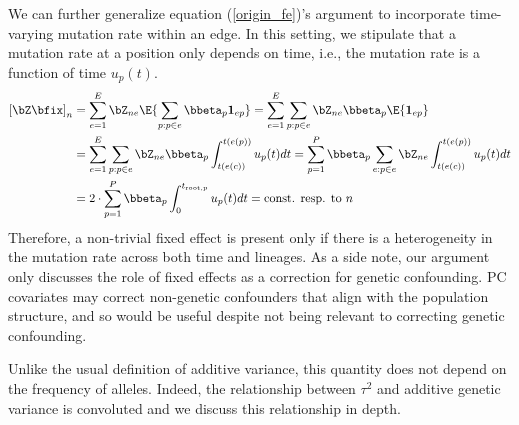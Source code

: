 We can further generalize equation (\ref{origin_fe})'s argument to incorporate time-varying mutation rate within an edge.
In this setting, we stipulate that a mutation rate at a position only depends on time, i.e., the mutation rate is a function of time $u_p(t)$.
\begin{align} 
    \begin{aligned}
        \left[\bZ \bfix \right]_n 
        &= \sum_{e=1}^E \bZ_{ne} \E{ \sum_{p:p\in e} \bbeta_p \mathbf{1}_{ep}}  
        = \sum_{e=1}^E \sum_{p:p\in e} \bZ_{ne} \bbeta_p \E{ \mathbf{1}_{ep}}  \\
        &= \sum_{e=1}^E \sum_{p:p\in e} \bZ_{ne} \bbeta_p \int_{t(e(c))}^{t(e(p))} u_p(t) dt  
        = \sum_{p=1}^P \bbeta_p \sum_{e: p \in e } \bZ_{ne}  \int_{t(e(c))}^{t(e(p))} u_p(t) dt  \\
        &=  2 \cdot \sum_{p=1}^P \bbeta_p \int_{0}^{t_{\mathrm{root},p}} u_p(t) dt
        = \text{const. resp. to $n$}
    \end{aligned}
\end{align}
Therefore, a non-trivial fixed effect is present only if there is a heterogeneity in the mutation rate across both time and lineages.
As a side note, our argument only discusses the role of fixed effects as a correction for genetic confounding.
PC covariates may correct non-genetic confounders that align with the population structure, and so would be useful despite not being relevant to correcting genetic confounding.





Unlike the usual definition of additive variance, this quantity does not depend on the frequency of alleles.
Indeed, the relationship between $\tau^2$ and additive genetic variance is convoluted and we discuss this relationship in depth.

